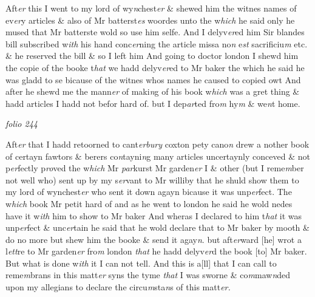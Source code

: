 \documentclass[12pt, a4paper]{book}
\begin{document}
		\ifthenelse{\isodd{\thepage}}
		{\reversemarginpar}
		{\normalmarginpar}
		Aft\textit{er} this I went to my lord of wy\textit{n}chest\textit{er} \& shewed him the witnes names
	of ev\textit{er}y articles \& also of Mr batterst\textit{es} woordes unto the w\textit{hich} he said
	only he mused that Mr batterste wold so use him selfe. And I
	delyv\textit{er}ed him Sir blandes bill subscribed w\textit{ith }his hand conc\textit{er}ning the
article missa no\textit{n} e\textit{st} sacrificiu\textit{m}
               etc.
			 \& he reserved the bill \& so I left him
And going to doctor london I shewd him the copie of the booke t\textit{hat} we
hadd delyv\textit{er}ed to Mr baker the which he said he was gladd to se bicause
of the witnes whos names he caused to copied owt And after he 
shewd me the mann\textit{er} of maki\textit{n}g of his book w\textit{hich} was a gret thing \&
hadd articles I hadd not befor hard of. but I dep\textit{ar}ted fro\textit{m} hy\textit{m} \& we\textit{n}t home.

\dotfill
						\newpage
{}

\textit{folio 244}


 	
		\ifthenelse{\isodd{\thepage}}
		{\reversemarginpar}
		{\normalmarginpar}
		Aft\textit{er} that I hadd retoorned to cant\textit{erbury} coxton pety cano\textit{n} drew a nother book
of certayn fawtors \& berers co\textit{n}tayni\textit{n}g many articles uncertaynly
	conceved \& not p\textit{er}fectly p\textit{ro}ved the w\textit{hich} Mr \textit{par}kurst Mr garden\textit{er} I \& other (but
I reme\textit{m}ber not well who) sent up by my s\textit{er}vant to Mr williby that 
he shuld show them to my lord of wynchest\textit{er} who sent it down
 		agayn bicause it was unp\textit{er}fect. The w\textit{hich} book Mr petit hard of and
as he went to london he said he wold nedes have it w\textit{ith} him to show
to Mr baker And wheras I declared to him t\textit{hat} it was unp\textit{er}fect \& unc\textit{er}tain
he said that he wold declare that to Mr baker by mooth \& do no
more but shew him the booke \& send it agay\textit{n}. but aft\textit{er}ward [he] 
wrot a l\textit{ett}re to Mr garden\textit{er} fro\textit{m} london \textit{that} he hadd delyv\textit{er}d the book [to]
Mr baker. But what is done w\textit{ith }it I can not tell. And this is
			 a[ll]
that I can call to reme\textit{m}brans in this matt\textit{er} syns the tyme \textit{that} I was
sworne \& co\textit{m}maw\textit{n}ded upon my allegians to declare the circu\textit{m}sta\textit{n}s of 
this matt\textit{er.} 
 	
\end{document}
